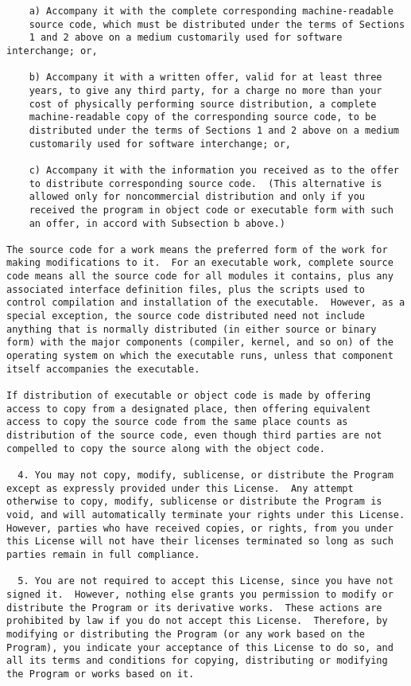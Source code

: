 \begin{verbatim}
    a) Accompany it with the complete corresponding machine-readable
    source code, which must be distributed under the terms of Sections
    1 and 2 above on a medium customarily used for software interchange; or,

    b) Accompany it with a written offer, valid for at least three
    years, to give any third party, for a charge no more than your
    cost of physically performing source distribution, a complete
    machine-readable copy of the corresponding source code, to be
    distributed under the terms of Sections 1 and 2 above on a medium
    customarily used for software interchange; or,

    c) Accompany it with the information you received as to the offer
    to distribute corresponding source code.  (This alternative is
    allowed only for noncommercial distribution and only if you
    received the program in object code or executable form with such
    an offer, in accord with Subsection b above.)

The source code for a work means the preferred form of the work for
making modifications to it.  For an executable work, complete source
code means all the source code for all modules it contains, plus any
associated interface definition files, plus the scripts used to
control compilation and installation of the executable.  However, as a
special exception, the source code distributed need not include
anything that is normally distributed (in either source or binary
form) with the major components (compiler, kernel, and so on) of the
operating system on which the executable runs, unless that component
itself accompanies the executable.

If distribution of executable or object code is made by offering
access to copy from a designated place, then offering equivalent
access to copy the source code from the same place counts as
distribution of the source code, even though third parties are not
compelled to copy the source along with the object code.

  4. You may not copy, modify, sublicense, or distribute the Program
except as expressly provided under this License.  Any attempt
otherwise to copy, modify, sublicense or distribute the Program is
void, and will automatically terminate your rights under this License.
However, parties who have received copies, or rights, from you under
this License will not have their licenses terminated so long as such
parties remain in full compliance.

  5. You are not required to accept this License, since you have not
signed it.  However, nothing else grants you permission to modify or
distribute the Program or its derivative works.  These actions are
prohibited by law if you do not accept this License.  Therefore, by
modifying or distributing the Program (or any work based on the
Program), you indicate your acceptance of this License to do so, and
all its terms and conditions for copying, distributing or modifying
the Program or works based on it.


\end{verbatim}
